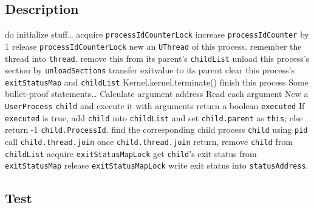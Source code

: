 \documentclass{article}
\begin{document}
\subsection{Description}
\begin{algorithm*}
    \begin{algorithmic}
					\State do initialize stuff\dots
					\State acquire \texttt{processIdCounterLock}
					\State increase \texttt{processIdCounter} by 1
					\State release \texttt{processIdCounterLock}
				\EndProcedure
					\State new an \texttt{UThread} of this process.
					\State remember the thread into \texttt{thread}.
				\EndProcedure
            \State remove this from its parent's \texttt{childList}
						\State unload this process's section by \texttt{unloadSections}
            \State transfer exitvalue to its parent
            \State clear this process's \texttt{exitStatusMap} and \texttt{childList}
                \State Kernel.kernel.terminate()
            \Else
                \State finish this process
            \EndIf
        \EndProcedure
					\State Some bullet-proof statements\dots
						\State Calculate argument address
						\State Read each argument
					\EndFor
					\State New a \texttt{UserProcess} \texttt{child} and execute it with arguments return a boolean \texttt{executed}
					\State If \texttt{executed} is true, add \texttt{child} into \texttt{childList} and set \texttt{child.parent} as \texttt{this}; else return -1
					\State \Return \texttt{child.ProcessId}.
				\EndProcedure
					\State find the corresponding child process \texttt{child} using \texttt{pid}
					\State call \texttt{child.thread.join}
					\State once \texttt{child.thread.join} return, remove \texttt{child} from \texttt{childList}
					\State acquire \texttt{exitStatusMapLock}
					\State get \texttt{child}'s exit status from \texttt{exitStatusMap}
					\State release \texttt{exitStatusMapLock}
					\State write exit status into \texttt{statusAddress}.
				\EndProcedure
    \end{algorithmic}
\end{algorithm*}
\subsection{Test}
\end{document}
